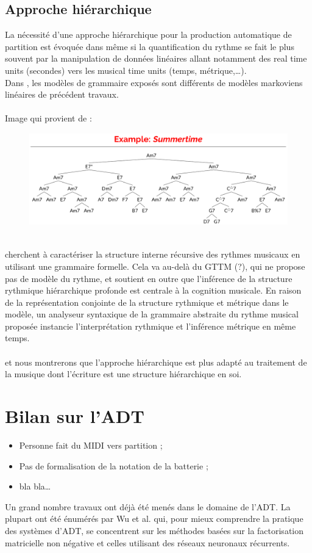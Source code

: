 \subsection*{Approche hiérarchique}
La nécessité d’une approche hiérarchique pour la production automatique de partition est évoquée dans \cite{foscarin:hal-01988990} même si la quantification du rythme se fait le plus souvent par la manipulation de données linéaires allant notamment des real time units (secondes) vers les musical time units (temps, métrique,…).\\
Dans \cite{foscarin:hal-01988990}, les modèles de grammaire exposés sont différents de modèles markoviens linéaires de précédent travaux.\\\\
Image qui provient de \cite{harasimjazz} :\\
\begin{figure}[h]
	\centering
	\includegraphics[height=40mm, width=120mm]{z_images/2_etat_de_l_art/summertime_tree.png}
\end{figure}\\

\cite{rohrmeier2020towards} cherchent à caractériser la structure interne récursive des rythmes musicaux en utilisant une grammaire formelle.
Cela va au-delà du GTTM (?), qui ne propose pas de modèle du rythme, et soutient en outre que l'inférence de la structure rythmique hiérarchique profonde est centrale à la cognition musicale. En raison de la représentation conjointe de la structure rythmique et métrique dans le modèle, un analyseur syntaxique de la grammaire abstraite du rythme musical proposée instancie l'interprétation rythmique et l'inférence métrique en même temps.\\\\
et nous montrerons que l’approche hiérarchique est plus adapté au traitement de la musique dont l’écriture est une structure hiérarchique en soi.
\section{Bilan sur l’ADT}
\begin{itemize}
	\item Personne fait du MIDI vers partition ;
	\item Pas de formalisation de la notation de la batterie ;
	\item bla bla…
\end{itemize}
Un grand nombre travaux ont déjà été menés dans le domaine de l’ADT. La plupart ont été énumérés par Wu et al. \cite{Review_ADT} qui, pour mieux comprendre la pratique des systèmes d’ADT, se concentrent sur les méthodes basées sur la factorisation matricielle non négative et celles utilisant des réseaux neuronaux récurrents.\\

